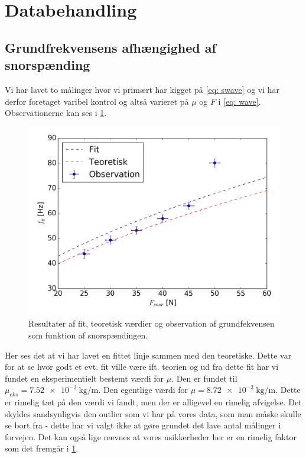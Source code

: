 \documentclass[A2_main.tex]{subfiles}
\begin{document}
\section{Databehandling}
\subsection{Grundfrekvensens afhængighed af snorspænding}
Vi har lavet to målinger hvor vi primært har kigget på \cref{eq: swave} og vi har derfor foretaget varibel kontrol og altså varieret på $\mu$ og $F$ i \cref{eq: wave}. Observationerne kan ses i \cref{fig:frekvensSNor}.
\begin{figure}[H]
    \includegraphics[width=\linewidth]{frekvensSnorSpaending.png}
    \caption{Resultater af fit, teoretisk værdier og observation af grundfekvensen som funktion af snorspændingen.}
    \label{fig:frekvensSNor}
\end{figure}

Her ses det at vi har lavet en fittet linje sammen med den teoretiske. Dette var for at se hvor godt et evt. fit ville være ift. teorien og ud fra dette fit har vi fundet en eksperimentielt bestemt værdi for $\mu$. Den er fundet til $\mu_{eks}=\SI{7.52e-3}{\kg\per\m}$. Den egentlige værdi for $\mu=\SI{8.72e-3}{\kg\per\m}$. Dette er rimelig tæt på den værdi vi fandt, men der er alligevel en rimelig afvigelse. Det skyldes sandsynligvis den outlier som vi har på vores data, som man måske skulle se bort fra - dette har vi valgt ikke at gøre grundet det lave antal målinger i forvejen. Det kan også lige nævnes at vores usikkerheder her er en rimelig faktor som det fremgår i \cref{fig:frekvensSNor}.
\end{document}
